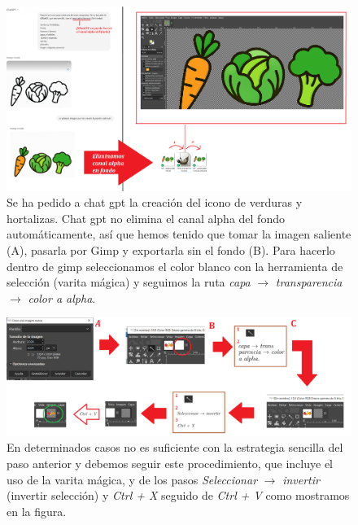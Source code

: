 \documentclass[a4paper,12pt]{report}
\begin{document}
	
	
	
\FloatBarrier
\setlength{\belowcaptionskip}{3pt}
\begin{figure}[H]
	\centering
	\caption{Se ha pedido a chat gpt la creación del icono de verduras y hortalizas. Chat gpt no elimina el canal alpha del fondo automáticamente, así que hemos tenido que tomar la imagen saliente (A), pasarla por Gimp y exportarla  sin el fondo (B). Para hacerlo dentro de gimp seleccionamos el color blanco con la herramienta de selección (varita mágica) y seguimos la ruta \textit{capa} $\rightarrow$ \textit{transparencia} $\rightarrow$ \textit{color a alpha}.}
	\includegraphics[width=1\linewidth]{img/eliminoCanalAlpha}


	\label{fig:eliminocanalalpha}
\end{figure}
\FloatBarrier


\FloatBarrier
\setlength{\belowcaptionskip}{3pt}
\begin{figure}[H]
	\centering
	\caption{En determinados casos no es suficiente con la estrategia sencilla del paso anterior y debemos seguir este procedimiento, que incluye el uso de la varita mágica, y de los pasos \textit{Seleccionar} $\rightarrow$ \textit{invertir} (invertir selección) y \textit{Ctrl + X} seguido de \textit{Ctrl + V} como mostramos en la figura.} 
	\includegraphics[width=1\linewidth]{img/eliminoCanalAlphaCOMPLEX.png}

	
	\label{fig:eliminocanalalphaCOMPLEX}
\end{figure}
\FloatBarrier
\end{document}
